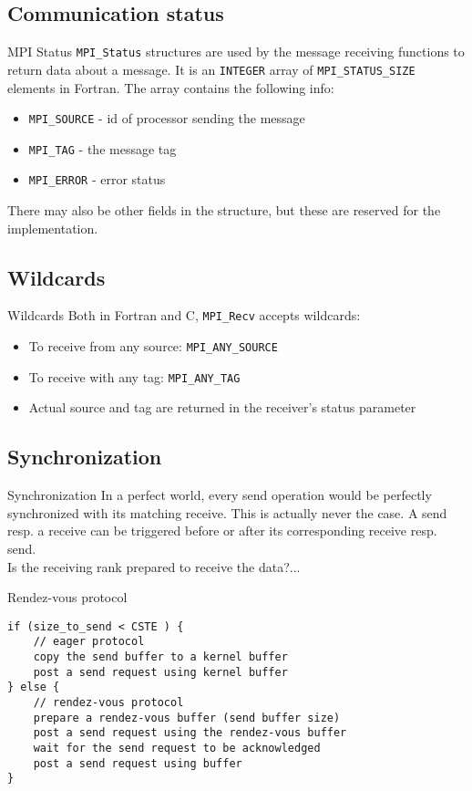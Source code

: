 \documentclass[aspectratio=43]{beamer}
\begin{document}
\subsection{Communication status}
\begin{frame}[fragile]{MPI Status}
\justifying
\verb+MPI_Status+ structures are used by the message receiving functions to return data about a message.
It is an \verb+INTEGER+ array of \verb+MPI_STATUS_SIZE+ elements in Fortran.
The array contains the following info:
\begin{itemize}
\item \verb+MPI_SOURCE+ - id of processor sending the message
\item \verb+MPI_TAG+ - the message tag
\item \verb+MPI_ERROR+ - error status
\end{itemize}
There may also be other fields in the structure, but these are reserved for the implementation.
\end{frame}

\subsection{Wildcards}
\begin{frame}[fragile]{Wildcards}
Both in Fortran and C,  \verb+MPI_Recv+ accepts wildcards:
\begin{itemize}
\item To receive from any source: \verb+MPI_ANY_SOURCE+
\item To receive with any tag: \verb+MPI_ANY_TAG+
\item Actual source and tag are returned in the receiver’s status parameter
\end{itemize}
\end{frame}


\subsection{Synchronization}
\begin{frame}[fragile]{Synchronization}
\justifying
In a perfect world, every send operation would be perfectly synchronized with its matching receive.
This is actually never the case.
A send resp. a receive can be triggered before or after its corresponding receive resp. send.\\
Is the receiving rank prepared to receive the data?...
\begin{blue1block}{Rendez-vous protocol}
\footnotesize
\begin{verbatim}
if (size_to_send < CSTE ) {
    // eager protocol
    copy the send buffer to a kernel buffer
    post a send request using kernel buffer
} else {
    // rendez-vous protocol
    prepare a rendez-vous buffer (send buffer size)
    post a send request using the rendez-vous buffer
    wait for the send request to be acknowledged
    post a send request using buffer
}
\end{verbatim}
\end{blue1block}
\end{frame}
\end{document}
